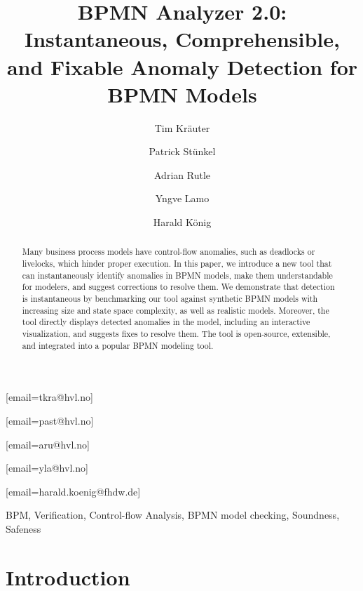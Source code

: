 \documentclass[
]{ceurart}
\begin{document}


\title{BPMN Analyzer 2.0: Instantaneous, Comprehensible, and Fixable Anomaly Detection for BPMN Models}

\author[1]{Tim Kräuter}
[email=tkra@hvl.no]
\author[1]{Patrick Stünkel}
[email=past@hvl.no] %
\author[1]{Adrian Rutle}
[email=aru@hvl.no]
\author[1]{Yngve Lamo}
[email=yla@hvl.no]
\author[2,1]{Harald König}
[email=harald.koenig@fhdw.de]
\address[1]{Western Norway University of Applied Sciences, Bergen, Norway}
\address[2]{FHDW Hannover, Germany}

\begin{abstract}
Many business process models have control-flow anomalies, such as deadlocks or livelocks, which hinder proper execution.
In this paper, we introduce a new tool that can instantaneously identify anomalies in BPMN models, make them understandable for modelers, and suggest corrections to resolve them.
We demonstrate that detection is instantaneous by benchmarking our tool against synthetic BPMN models with increasing size and state space complexity, as well as realistic models.
Moreover, the tool directly displays detected anomalies in the model, including an interactive visualization, and suggests fixes to resolve them.
The tool is open-source, extensible, and integrated into a popular BPMN modeling tool.
\end{abstract}

\begin{keywords}
BPM,
Verification,
Control-flow Analysis,
BPMN model checking,
Soundness,
Safeness
\end{keywords}


\maketitle

\section{Introduction}
\end{document}

